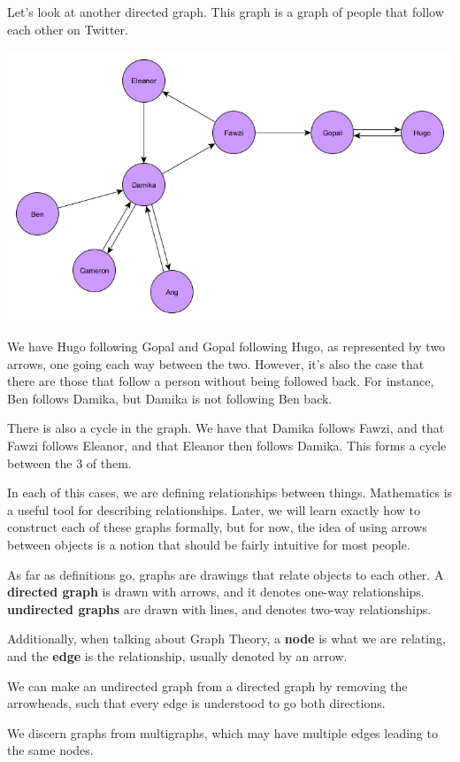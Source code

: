 Let's look at another directed graph. This graph is a graph of people that follow each other on Twitter.

\includegraphics{01/FollowersOnTwitter.png}

We have Hugo following Gopal and Gopal following Hugo, as represented by two arrows, one going each way between the two. However, it's also the case that there are those that follow a person without being followed back. For instance, Ben follows Damika, but Damika is not following Ben back. 

There is also a cycle in the graph. We have that Damika follows Fawzi, and that Fawzi follows Eleanor, and that Eleanor then follows Damika. This forms a cycle between the 3 of them.

In each of this cases, we are defining relationships between things. Mathematics is a useful tool for describing relationships. Later, we will learn exactly how to construct each of these graphs formally, but for now, the idea of using arrows between objects is a notion that should be fairly intuitive for most people.

As far as definitions go, graphs are drawings that relate objects to each other. A \textbf{directed graph} is drawn with arrows, and it denotes one-way relationships. \textbf{undirected graphs} are drawn with lines, and denotes two-way relationships.

Additionally, when talking about Graph Theory, a \textbf{node} is what we are relating, and the \textbf{edge} is the relationship, usually denoted by an arrow.

We can make an undirected graph from a directed graph by removing the arrowheads, such that every edge is understood to go both directions.

We discern graphs from multigraphs, which may have multiple edges leading to the same nodes.


